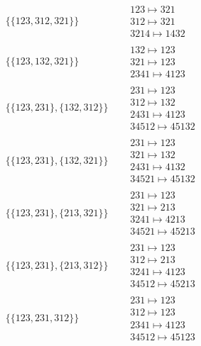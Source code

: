 \begin{tiny}
\begin{align}
\begin{matrix}
\end{matrix}
\\
\{\{123, 312, 321\}\}
\quad
&
\begin{matrix}
123 \mapsto 321\\312 \mapsto 321\\3214 \mapsto 1432
\end{matrix}
\\
\{\{123, 132, 321\}\}
\quad
&
\begin{matrix}
132 \mapsto 123\\321 \mapsto 123\\2341 \mapsto 4123
\end{matrix}
\\
\{\{123, 231\}, \{132, 312\}\}
\quad
&
\begin{matrix}
231 \mapsto 123\\312 \mapsto 132\\2431 \mapsto 4123\\34512 \mapsto 45132
\end{matrix}
\\
\{\{123, 231\}, \{132, 321\}\}
\quad
&
\begin{matrix}
231 \mapsto 123\\321 \mapsto 132\\2431 \mapsto 4132\\34521 \mapsto 45132
\end{matrix}
\\
\{\{123, 231\}, \{213, 321\}\}
\quad
&
\begin{matrix}
231 \mapsto 123\\321 \mapsto 213\\3241 \mapsto 4213\\34521 \mapsto 45213
\end{matrix}
\\
\{\{123, 231\}, \{213, 312\}\}
\quad
&
\begin{matrix}
231 \mapsto 123\\312 \mapsto 213\\3241 \mapsto 4123\\34512 \mapsto 45213
\end{matrix}
\\
\{\{123, 231, 312\}\}
\quad
&
\begin{matrix}
231 \mapsto 123\\312 \mapsto 123\\2341 \mapsto 4123\\34512 \mapsto 45123
\end{matrix}
\\

\end{align}
\end{tiny}
